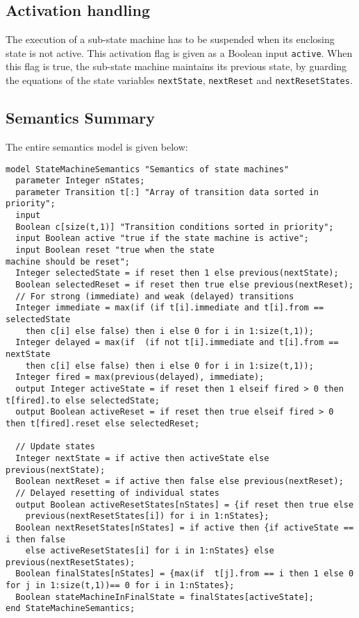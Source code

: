 \subsection{Activation handling}

The execution of a sub-state machine has to be suspended when its
enclosing state is not active. This activation flag is given as a
Boolean input \lstinline!active!. When this flag is true, the sub-state machine
maintains its previous state, by guarding the equations of the state
variables \lstinline!nextState!, \lstinline!nextReset! and \lstinline!nextResetStates!.

\subsection{Semantics Summary}

The entire semantics model is given below:

\begin{lstlisting}[language=modelica]
model StateMachineSemantics "Semantics of state machines"
  parameter Integer nStates;
  parameter Transition t[:] "Array of transition data sorted in priority";
  input
  Boolean c[size(t,1)] "Transition conditions sorted in priority";
  input Boolean active "true if the state machine is active";
  input Boolean reset "true when the state
machine should be reset";
  Integer selectedState = if reset then 1 else previous(nextState);
  Boolean selectedReset = if reset then true else previous(nextReset);
  // For strong (immediate) and weak (delayed) transitions
  Integer immediate = max(if (if t[i].immediate and t[i].from == selectedState
    then c[i] else false) then i else 0 for i in 1:size(t,1));
  Integer delayed = max(if  (if not t[i].immediate and t[i].from == nextState
    then c[i] else false) then i else 0 for i in 1:size(t,1));
  Integer fired = max(previous(delayed), immediate);
  output Integer activeState = if reset then 1 elseif fired > 0 then t[fired].to else selectedState;
  output Boolean activeReset = if reset then true elseif fired > 0 then t[fired].reset else selectedReset;

  // Update states
  Integer nextState = if active then activeState else previous(nextState);
  Boolean nextReset = if active then false else previous(nextReset);
  // Delayed resetting of individual states
  output Boolean activeResetStates[nStates] = {if reset then true else
    previous(nextResetStates[i]) for i in 1:nStates};
  Boolean nextResetStates[nStates] = if active then {if activeState == i then false
    else activeResetStates[i] for i in 1:nStates} else previous(nextResetStates);
  Boolean finalStates[nStates] = {max(if  t[j].from == i then 1 else 0 for j in 1:size(t,1))== 0 for i in 1:nStates};
  Boolean stateMachineInFinalState = finalStates[activeState];
end StateMachineSemantics;
\end{lstlisting}
